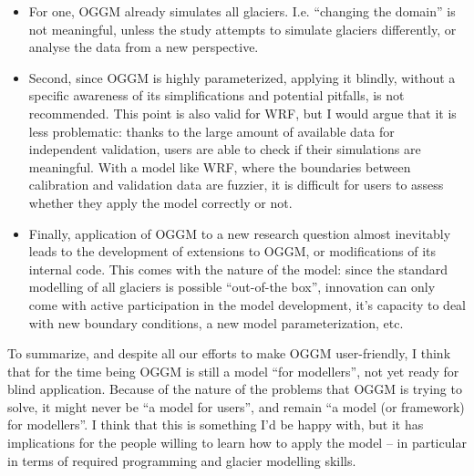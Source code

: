 \begin{itemize}
\item {} 
For one, OGGM already simulates
all glaciers. I.e. “changing the domain” is not meaningful, unless the study attempts to simulate glaciers
differently, or analyse the data from a new perspective.

\item {} 
Second, since OGGM is highly parameterized, applying it blindly, without a specific awareness of its simplifications
and potential pitfalls, is not recommended.
This point is also valid for WRF, but I would argue that it is less problematic: thanks to the large
amount of available data for independent validation, users are able to check if their simulations are meaningful.
With a model like WRF, where the boundaries between calibration and validation data are fuzzier, it is difficult
for users to assess whether they apply the model correctly or not.

\item {} 
Finally, application of OGGM to a new research question almost inevitably leads to the development of extensions to
OGGM, or modifications of its internal code. This comes with the nature of the model: since the standard modelling of all
glaciers is possible “out-of-the box”, innovation can only come with active participation in the model development,
it’s capacity to deal with new boundary conditions, a new model parameterization, etc.

\end{itemize}

To summarize, and despite all our efforts to make OGGM user-friendly, I think that for the time being OGGM is
still a model “for modellers”, not yet ready for blind application. Because of the nature of the problems that
OGGM is trying to solve, it might never be “a model for users”, and remain “a model (or framework) for modellers”.
I think that this is something I’d be happy with, but it has implications for the people willing to learn how to apply
the model -- in particular in terms of required programming and glacier modelling skills.